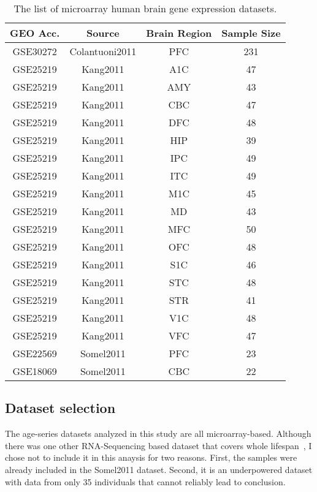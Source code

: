 \begin{table}[ht]
\centering
\caption{The list of microarray human brain gene expression datasets.}\label{table:table1}
\begin{tabular}{|c c c c|}
 \hline
 \textbf{GEO Acc.} & \textbf{Source} & \textbf{Brain Region} & \textbf{Sample Size} \\ [0.5ex] 
 \hline\hline
 GSE30272 & Colantuoni2011 & PFC & 231 \\ 
 \hline
 GSE25219 & Kang2011 & A1C & 47 \\
 \hline
 GSE25219 & Kang2011 & AMY & 43 \\
 \hline
 GSE25219 & Kang2011 & CBC & 47 \\
 \hline
 GSE25219 & Kang2011 & DFC & 48 \\
 \hline
 GSE25219 & Kang2011 & HIP & 39 \\
 \hline
 GSE25219 & Kang2011 & IPC & 49 \\
 \hline
 GSE25219 & Kang2011 & ITC & 49 \\
 \hline
 GSE25219 & Kang2011 & M1C & 45 \\
 \hline
 GSE25219 & Kang2011 & MD & 43 \\
 \hline
 GSE25219 & Kang2011 & MFC & 50 \\
 \hline
 GSE25219 & Kang2011 & OFC & 48 \\
 \hline
 GSE25219 & Kang2011 & S1C & 46 \\
 \hline
 GSE25219 & Kang2011 & STC & 48 \\
 \hline
 GSE25219 & Kang2011 & STR & 41 \\
 \hline
 GSE25219 & Kang2011 & V1C & 48 \\
 \hline
 GSE25219 & Kang2011 & VFC & 47 \\
 \hline
 GSE22569 & Somel2011 & PFC & 23 \\
 \hline
 GSE18069 & Somel2011 & CBC & 22 \\
\hline
\end{tabular}
\end{table}

\subsection{Dataset selection}
The age-series datasets analyzed in this study are all microarray-based. 
Although there was one other RNA-Sequencing based dataset that covers whole lifespan~\cite{Mazin2013}, I chose not to include it in this anaysis for two reasons.
First, the samples were already included in the Somel2011 dataset. 
Second, it is an underpowered dataset with data from only 35 individuals that cannot reliably lead to conclusion.

